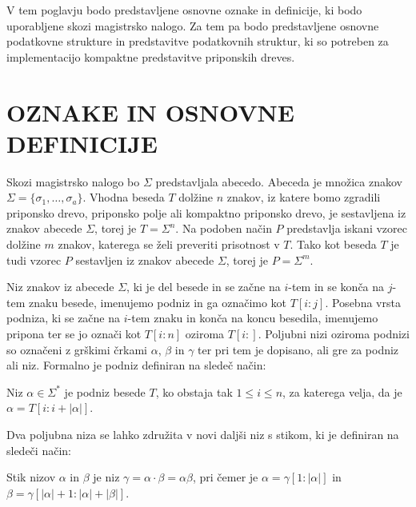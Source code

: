 
V tem poglavju bodo predstavljene osnovne oznake in definicije, ki bodo uporabljene skozi magistrsko nalogo. Za tem pa bodo predstavljene osnovne podatkovne strukture in predstavitve podatkovnih struktur, ki so potreben za implementacijo kompaktne predstavitve priponskih dreves.


\section{OZNAKE IN OSNOVNE DEFINICIJE}\label{sec:def}
Skozi magistrsko nalogo bo $\Sigma$ predstavljala abecedo. Abeceda je množica znakov $\Sigma=\{\sigma_1,\dots,\sigma_a\}$. Vhodna beseda $T$ dolžine $n$ znakov, iz katere bomo zgradili priponsko drevo, priponsko polje ali kompaktno priponsko drevo, je sestavljena iz znakov abecede $\Sigma$, torej je $T=\Sigma^n$. Na podoben način $P$ predstavlja iskani vzorec dolžine $m$ znakov, katerega se želi preveriti prisotnost v $T$. Tako kot beseda $T$ je tudi vzorec $P$ sestavljen iz znakov abecede $\Sigma$, torej je $P=\Sigma^m$.

Niz znakov iz abecede $\Sigma$, ki je del besede in se začne na $i$-tem in se konča na $j$-tem znaku besede, imenujemo podniz in ga označimo kot $T[i:j]$. Posebna vrsta podniza, ki se začne na $i$-tem znaku in konča na koncu besedila, imenujemo pripona ter se jo označi kot $T[i:n]$ oziroma $T[i:]$. Poljubni nizi oziroma podnizi so označeni z grškimi črkami $\alpha$, $\beta$ in $\gamma$ ter pri tem je dopisano, ali gre za podniz ali niz. Formalno je podniz definiran na sledeč način:
\begin{defi}
    Niz $\alpha\in\Sigma^*$ je podniz besede $T$, ko obstaja tak $1\le i\le n$, za katerega velja, da je  $\alpha=T[i:i+|\alpha|]$. 
\end{defi}
Dva poljubna niza se lahko združita v novi daljši niz s stikom, ki je definiran na sledeči način:
\begin{defi}
    Stik nizov $\alpha$ in $\beta$ je niz $\gamma=\alpha\cdot\beta=\alpha\beta$, pri čemer je $\alpha=\gamma[1:|\alpha|]$ in $\beta=\gamma[|\alpha|+1:|\alpha|+|\beta|]$.
\end{defi}

